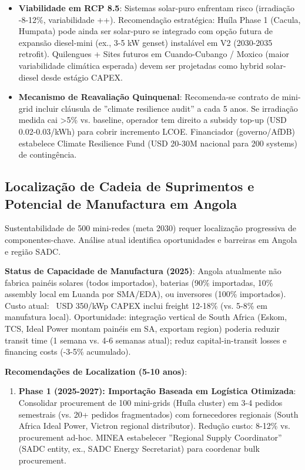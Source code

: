 \documentclass[12pt, a4paper]{article}
\begin{document}
{{{{{{{{{{{{\begin{itemize}
\item \textbf{Viabilidade em RCP 8.5}: Sistemas solar-puro enfrentam risco (irradiação -8-12\%, variabilidade ++). Recomendação estratégica: Huíla Phase 1 (Cacula, Humpata) pode ainda ser solar-puro se integrado com opção futura de expansão diesel-mini (ex., 3-5 kW genset) instalável em V2 (2030-2035 retrofit). Quilengues + Sites futuros em Cuando-Cubango / Moxico (maior variabilidade climática esperada) devem ser projetadas como hybrid solar-diesel desde estágio CAPEX.

\item \textbf{Mecanismo de Reavaliação Quinquenal}: Recomenda-se contrato de mini-grid incluir cláusula de ''climate resilience audit'' a cada 5 anos. Se irradiação medida cai >5\% vs. baseline, operador tem direito a subsidy top-up (USD 0.02-0.03/kWh) para cobrir incremento LCOE. Financiador (governo/AfDB) estabelece Climate Resilience Fund (USD 20-30M nacional para 200 systems) de contingência.
\end{itemize}

\subsection{Localização de Cadeia de Suprimentos e Potencial de Manufactura em Angola}

Sustentabilidade de 500 mini-redes (meta 2030) requer localização progressiva de componentes-chave. Análise atual identifica oportunidades e barreiras em Angola e região SADC.

\textbf{Status de Capacidade de Manufactura (2025)}: Angola atualmente não fabrica painéis solares (todos importados), baterias (90\% importadas, 10\% assembly local em Luanda por SMA/EDA), ou inversores (100\% importados). Custo atual: ~USD 350/kWp CAPEX inclui freight 12-18\% (vs. 5-8\% em manufatura local). Oportunidade: integração vertical de South Africa (Eskom, TCS, Ideal Power montam painéis em SA, exportam region) poderia reduzir transit time (1 semana vs. 4-6 semanas atual); reduz capital-in-transit losses e financing costs (-3-5\% acumulado).

\textbf{Recomendações de Localization (5-10 anos)}:

\begin{enumerate}
\item \textbf{Phase 1 (2025-2027): Importação Baseada em Logística Otimizada}: Consolidar procurement de 100 mini-grids (Huíla cluster) em 3-4 pedidos semestrais (vs. 20+ pedidos fragmentados) com fornecedores regionais (South Africa Ideal Power, Victron regional distributor). Redução custo: 8-12\% vs. procurement ad-hoc. MINEA estabelecer ''Regional Supply Coordinator'' (SADC entity, ex., SADC Energy Secretariat) para coordenar bulk procurement.


\end{enumerate}}}}}}}}}}}}}
\end{document}
